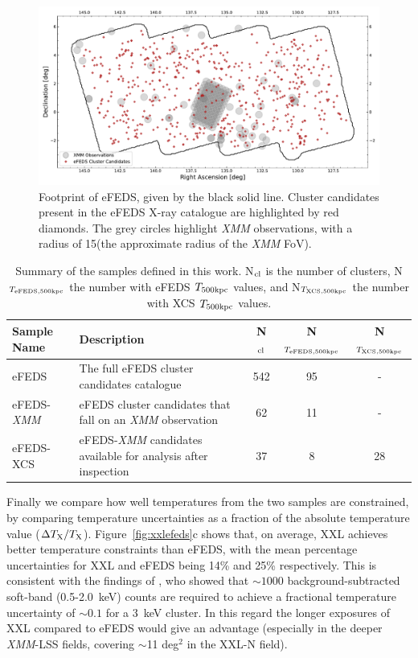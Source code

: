 \documentclass[fleqn,usenatbib]{mnras}
\begin{document}
\begin{figure}
    \centering
    \includegraphics[width=1.0\textwidth]{images/efeds_outline_xmm_pointings.pdf}
    \caption[]{Footprint of eFEDS, given by the black solid line. Cluster candidates present in the eFEDS X-ray catalogue are highlighted by red diamonds. The grey circles highlight {\em XMM} observations, with a radius of 15\arcmin (the approximate radius of the {\em XMM} FoV).}
    \label{fig:efedsxcsclusters}
\end{figure}

\begin{table}
\begin{center}
\caption[]{{Summary of the samples defined in this work. N$_{\rm{cl}}$ is the number of clusters, N$_{T_{\rm{eFEDS, 500kpc}}}$ the number with eFEDS $T_{\rm{500kpc}}$ values, and N$_{T_{\rm{XCS, 500kpc}}}$ the number with XCS $T_{\rm{500kpc}}$ values.}\label{tab:samples}}
\vspace{1mm}
\begin{tabular}{l|lccc}
\hline
\hline
Sample Name & Description & N$_{\rm{cl}}$ & N$_{T_{\rm{eFEDS, 500kpc}}}$ & N$_{T_{\rm{XCS, 500kpc}}}$\\
\hline
\hline
eFEDS & The full eFEDS cluster candidates catalogue & 542 & 95 & - \\
\hline
eFEDS-{\em XMM} & eFEDS cluster candidates that fall on an {\em XMM} observation & 62 & 11 & - \\
\hline
eFEDS-XCS & eFEDS-{\em XMM} candidates available for analysis after inspection & 37 & 8 & 28 \\
\hline
\end{tabular}
\end{center}
\end{table}


Finally we compare how well temperatures from the two samples are constrained, by comparing temperature uncertainties as a fraction of the absolute temperature value ($\Delta T_{\rm{X}}/T_{\rm{X}}$). Figure~\ref{fig:xxlefeds}c shows that, on average, XXL achieves better temperature constraints than eFEDS, with the mean percentage uncertainties for XXL and eFEDS being 14\% and 25\% respectively. This is consistent with the findings of \cite{xcsmethod}, who showed that ${\sim}1000$ background-subtracted soft-band (0.5-2.0~keV) counts are required to achieve a fractional temperature uncertainty of ${\sim}0.1$ for a 3~keV cluster. In this regard the longer exposures of XXL compared to eFEDS would give an advantage (especially in the deeper {\em XMM}-LSS fields, covering ${\sim}$11 deg$^{2}$ in the XXL-N field). 
\end{document}
